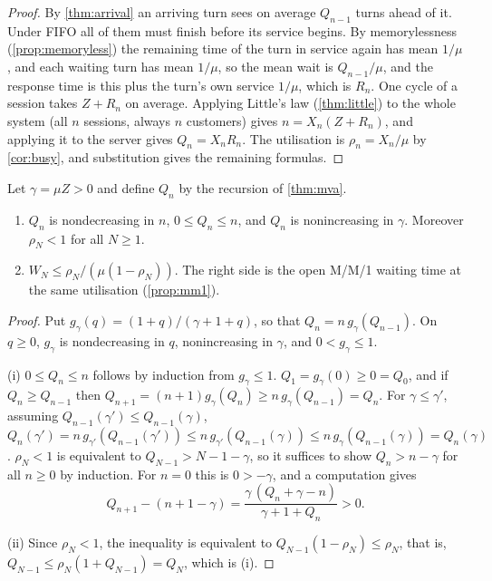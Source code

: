 \begin{proof}
By \cref{thm:arrival} an arriving turn sees on average $Q_{n-1}$ turns ahead of
it. Under FIFO all of them must finish before its service begins. By
memorylessness (\cref{prop:memoryless}) the remaining time of the turn in service
again has mean $1/\mu$, and each waiting turn has mean $1/\mu$, so the mean wait
is $Q_{n-1}/\mu$, and the response time is this plus the turn's own service
$1/\mu$, which is $R_n$. One cycle of a session takes $Z+R_n$ on average.
Applying Little's law (\cref{thm:little}) to the whole system (all $n$ sessions,
always $n$ customers) gives $n=X_n(Z+R_n)$, and applying it to the server gives
$Q_n=X_nR_n$. The utilisation is $\rho_n=X_n/\mu$ by \cref{cor:busy}, and
substitution gives the remaining formulas.
\end{proof}

\begin{proposition}\label{prop:finite}
Let $\gamma=\mu Z>0$ and define $Q_n$ by the recursion of \cref{thm:mva}.
\begin{enumerate}[label=(\roman*)]
\item $Q_n$ is nondecreasing in $n$, $0\le Q_n\le n$, and $Q_n$ is nonincreasing
  in $\gamma$. Moreover $\rho_N<1$ for all $N\ge1$.
\item $W_N\le\rho_N/(\mu(1-\rho_N))$. The right side is the open M/M/1 waiting
  time at the same utilisation (\cref{prop:mm1}).
\end{enumerate}
\end{proposition}

\begin{proof}
Put $g_\gamma(q)=(1+q)/(\gamma+1+q)$, so that $Q_n=n\,g_\gamma(Q_{n-1})$. On $q\ge0$, $g_\gamma$ is
nondecreasing in $q$, nonincreasing in $\gamma$, and $0<g_\gamma\le1$.

(i) $0\le Q_n\le n$ follows by induction from $g_\gamma\le 1$. $Q_1=g_\gamma(0)\ge0=Q_0$,
and if $Q_n\ge Q_{n-1}$ then $Q_{n+1}=(n+1)g_\gamma(Q_n)\ge n\,g_\gamma(Q_{n-1})=Q_n$.
For $\gamma\le \gamma'$, assuming $Q_{n-1}(\gamma')\le Q_{n-1}(\gamma)$,
$Q_n(\gamma')=n\,g_{\gamma'}(Q_{n-1}(\gamma'))\le n\,g_{\gamma'}(Q_{n-1}(\gamma))\le n\,g_\gamma(Q_{n-1}(\gamma))=Q_n(\gamma)$.
$\rho_N<1$ is equivalent to $Q_{N-1}>N-1-\gamma$, so it suffices to show $Q_n>n-\gamma$ for
all $n\ge0$ by induction. For $n=0$ this is $0>-\gamma$, and a computation gives
\[
  Q_{n+1}-(n+1-\gamma)=\frac{\gamma\,(Q_n+\gamma-n)}{\gamma+1+Q_n}>0 .
\]

(ii) Since $\rho_N<1$, the inequality is equivalent to
$Q_{N-1}(1-\rho_N)\le\rho_N$, that is, $Q_{N-1}\le\rho_N(1+Q_{N-1})=Q_N$, which is
(i).
\end{proof}

